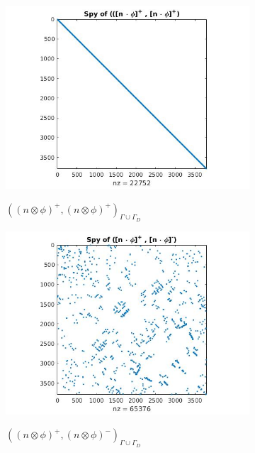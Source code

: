 \documentclass[a4paper,twoside,openright]{book}
\begin{document}
\begin{figure}
  \begin{subfigure}{0.5\textwidth}
    \includegraphics[width=\linewidth]{figure21.jpg}
    \label{fig:figure21}
	\caption{$((n \otimes \phi)^+,(n \otimes \phi)^+)_{\Gamma \cup \Gamma_D}$}      
  \end{subfigure}
  \begin{subfigure}{0.5\textwidth}
    \includegraphics[width=\linewidth]{figure22.jpg}
    \label{fig:figure22}
	\caption{$((n \otimes \phi)^+,(n \otimes \phi)^-)_{\Gamma \cup \Gamma_D}$}      
  \end{subfigure}
    \begin{subfigure}{0.5\textwidth}

\end{subfigure}
\end{figure}
\end{document}
